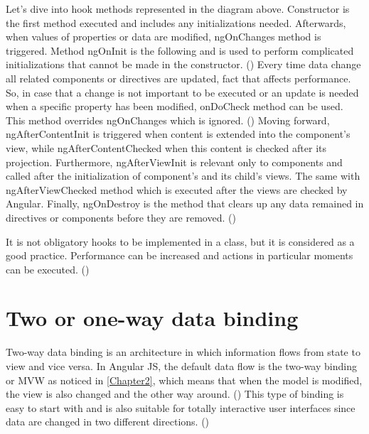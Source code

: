 Let's dive into hook methods represented in the diagram above. Constructor is the first method executed and includes any initializations needed. Afterwards, when values of properties or data are modified, ngOnChanges method is triggered. Method ngOnInit is the following and is used to perform complicated initializations that cannot be made in the constructor. (\cite{Reference19}) Every time data change all related components or directives are updated, fact that affects performance. So, in case that a change is not important to be executed or an update is needed when a specific property has been modified, onDoCheck method can be used. This method overrides ngOnChanges which is ignored. (\cite{murray2018ng}) Moving forward, ngAfterContentInit is triggered when content is extended into the component's view, while ngAfterContentChecked when this content is checked after its projection. Furthermore, ngAfterViewInit is relevant only to components and called after the initialization of component's and its child's views. The same with ngAfterViewChecked method which is executed after the views are checked by Angular. Finally, ngOnDestroy is the method that clears up any data remained in directives or components before they are removed. (\cite{Reference19}) \par

It is not obligatory hooks to be implemented in a class, but it is considered as a good practice. Performance can be increased and actions in particular moments can be executed. (\cite{murray2018ng}) \par

\section{Two or one-way data binding}

Two-way data binding is an architecture in which information flows from state to view and vice versa. In Angular JS, the default data flow is the two-way binding or MVW as noticed in \ref{Chapter2}, which means that when the model is modified, the view is also changed and the other way around. (\cite{murray2018ng}) This type of binding is easy to start with and is also suitable for totally interactive user interfaces since data are changed in two different directions. (\cite{Reference21}) \par

